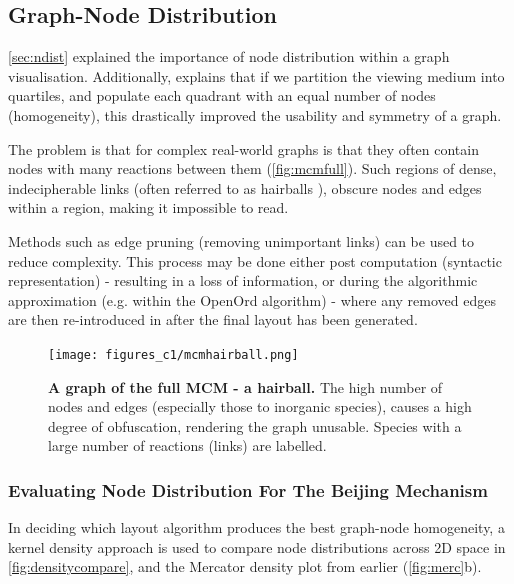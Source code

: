 \subsection{Graph-Node Distribution}\label{sec:nodedist}

\autoref{sec:ndist} explained the importance of node distribution within a graph visualisation. Additionally, \cite{ch6graphredability} explains that if we partition the viewing medium into quartiles, and populate each quadrant with an equal number of nodes (homogeneity), this drastically improved the usability and symmetry of a graph.

The problem is that for complex real-world graphs is that they often contain nodes with many reactions between them (\autoref{fig:mcmfull}). Such regions of dense, indecipherable links (often referred to as hairballs \citep{vislarge}), obscure nodes and edges within a region, making it impossible to read.

Methods such as edge pruning \citep{edgeprune} (removing unimportant links) can be used to reduce complexity. This process may be done either post computation (syntactic representation) - resulting in a loss of information, or during the algorithmic approximation (e.g. within the OpenOrd algorithm) - where any removed edges are then re-introduced in after the final layout has been generated.


\begin{figure}[H]
     \centering
     \texttt{[image: figures\_c1/mcmhairball.png]}
        \caption{\textbf{A graph of the full MCM - a hairball.} The high number of nodes and edges (especially those to inorganic species), causes a high degree of obfuscation, rendering the graph unusable. Species with a large number of reactions (links) are labelled.}
        \label{fig:mcmfull}
\end{figure}

\subsubsection{Evaluating Node Distribution For The Beijing Mechanism}\label{sec:evalnd}


In deciding which layout algorithm produces the best graph-node homogeneity, a kernel density approach is used to compare node distributions across 2D space in \autoref{fig:densitycompare}, and the Mercator density plot from earlier (\autoref{fig:merc}b).

